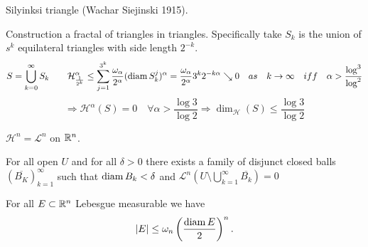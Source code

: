 Silyinksi triangle (Wachar Siejinski 1915).

Construction a fractal of triangles in triangles. Specifically take $S_k$ is the
union of $s^k$ equilateral triangles with side length $2^{-k}$.
\[
S = \bigcup_{k=0}^\infty S_k
\qquad
\mathcal{H}^\alpha_{\frac{1}{2^k}} \leq \sum_{j=1}^{3^k}
\frac{\omega_\alpha}{2^\alpha} ( \operatorname{diam} S_k^j)^\alpha 
= \frac{\omega_\alpha}{2^\alpha} 3^k 2^{-k\alpha} \searrow 0 \quad as \quad k\to
\infty \quad iff \quad \alpha > \frac{\log^3}{\log^2}
\]
\[
\Rightarrow \mathcal{H}^\alpha(S) = 0 \quad \forall \alpha > \frac{\log 3}{\log
2} \Rightarrow \dim_{\mathcal{H}}(S) \leq \frac{\log 3}{\log 2}
\]

\begin{theorem}
$\mathcal{H}^n = \mathcal{L}^n$ on $\mathbb{R}^n$.
\end{theorem}

\begin{lemma}
For all open $U$ and for all $\delta > 0$ there exists a family of disjunct
closed balls $(\overline{B_K})_{k=1}^\infty$ such that $\operatorname{diam} B_k < \delta$ and
$\mathcal{L}^n(U \setminus \bigcup_{k=1}^\infty \overline{B_k}) = 0$ 
\end{lemma}

\begin{theorem}
For all $E \subset \mathbb{R}^n$ Lebesgue measurable we have 
\[
|E| \leq \omega_n \left(\frac{\operatorname{diam} E}{2}\right)^n.
\]
\end{theorem}

